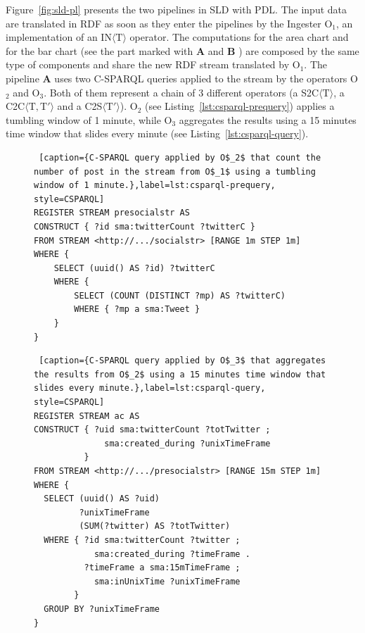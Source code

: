 {Figure~\ref{fig:sld-pl} presents the two pipelines in SLD with PDL.
The input data are translated in RDF as soon as they enter the pipelines by the \textsf{Ingester} O$_1$, an implementation of an IN$\langle\mathrm{T}\rangle$ operator. The computations for the area chart and for the bar chart (see the part marked with \textbf{A} and \textbf{B} ) are composed by the same type of components and share the new RDF stream translated by O$_1$.
The pipeline \textbf{A} uses two C-SPARQL queries applied to the stream by the operators O$_2$ and O$_3$. Both of them represent a chain of 3 different \river{} operators (a S2C$\langle\mathrm{T}\rangle$, a C2C$\langle\mathrm{T},\mathrm{T}'\rangle$ and a C2S$\langle\mathrm{T}'\rangle$). 
O$_2$ (see Listing~\ref{lst:csparql-prequery}) applies a tumbling window of 1 minute, while O$_3$ aggregates the results using a 15 minutes time window that slides every minute (see Listing~\ref{lst:csparql-query}). 

\begin{figure}[ht]
\begin{minipage}{0.95\linewidth}
\begin{lstlisting} [caption={C-SPARQL query applied by O$_2$ that count the number of post in the stream from O$_1$ using a tumbling window of 1 minute.},label=lst:csparql-prequery, style=CSPARQL]
REGISTER STREAM presocialstr AS 
CONSTRUCT { ?id sma:twitterCount ?twitterC } 
FROM STREAM <http://.../socialstr> [RANGE 1m STEP 1m] 
WHERE { 
    SELECT (uuid() AS ?id) ?twitterC 
    WHERE { 
        SELECT (COUNT (DISTINCT ?mp) AS ?twitterC) 
        WHERE { ?mp a sma:Tweet } 
    } 
}
\end{lstlisting}
\end{minipage}
\end{figure}

\begin{figure}[ht]
\begin{minipage}{0.95\linewidth}
\begin{lstlisting} [caption={C-SPARQL query applied by O$_3$ that aggregates the results from O$_2$ using a 15 minutes time window that slides every minute.},label=lst:csparql-query, style=CSPARQL]
REGISTER STREAM ac AS 
CONSTRUCT { ?uid sma:twitterCount ?totTwitter ; 
              sma:created_during ?unixTimeFrame 
          } 
FROM STREAM <http://.../presocialstr> [RANGE 15m STEP 1m] 
WHERE { 
  SELECT (uuid() AS ?uid) 
         ?unixTimeFrame 
         (SUM(?twitter) AS ?totTwitter)
  WHERE { ?id sma:twitterCount ?twitter ; 
            sma:created_during ?timeFrame . 
          ?timeFrame a sma:15mTimeFrame ; 
            sma:inUnixTime ?unixTimeFrame  
        } 
  GROUP BY ?unixTimeFrame 
}
\end{lstlisting}
\end{minipage}
\end{figure}

}
